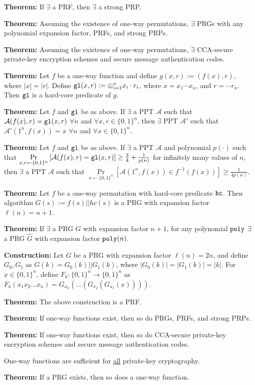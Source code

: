 \documentclass[10pt]{article}
\newcommand{\AAA}{\mathcal{A}}
\newcommand{\thm}[1]{{\bf Theorem:} \underline{#1}}
\newcommand{\con}[1]{{\bf Construction:} \underline{#1}}
\newcommand{\xor}{\oplus}
\newcommand{\poly}{{\tt poly}}
\newcommand{\hc}{{\tt hc}}
\newcommand{\gl}{{\tt gl}}
\newcommand{\from}{\leftarrow}
\begin{document}
\begin{multicols}{4}
\thm{}If $\exists$ a PRF, then $\exists$ a strong PRP.

\thm{}Assuming the existence of one-way permutations, $\exists$ PRGs with any polynomial expansion factor, PRFs, and strong PRPs.

\thm{}Assuming the existence of one-way permutations, $\exists$ CCA-secure private-key encryption schemes and secure message authentication codes.

\thm{}Let $f$ be a one-way function and define $g(x,r):=(f(x),r)$, where $|x|=|r|$. Define $\gl(x,r):=\xor_{i=1}^{n}x_i\cdot r_i$, where $x=x_1\cdots x_n$, and $r=\cdots r_n$. Then $\gl$ is a hard-core predicate of $g$.

\thm{}Let $f$ and $\gl$ be as above. If $\exists$ a PPT $\AAA$ such that $\AAA(f(x),r)=\gl(x,r)$ $\forall n$ and $\forall x,r\in\{0,1\}^n$, then $\exists$ PPT $\AAA'$ such that $\AAA'(1^n,f(x))=x$ $\forall n$ and $\forall x\in\{0,1\}^n$.

\thm{}Let $f$ and $\gl$ be as above. If $\exists$ a PPT $\AAA$ and polynomial $p(\cdot)$ such that $\Pr\limits_{x,r\from\{0,1\}^n}\left[\AAA(f(x),r)=\gl(x,r)\right]\geq\frac{3}{4}+\frac{1}{p(n)}$ for infinitely many values of $n$, then $\exists$ a PPT $\AAA$ such that $\Pr\limits_{x\from\{0,1\}^n}\left[\AAA(1^n,f(x))\in f^{-1}(f(x))\right]\geq\frac{1}{4p(n)}$.

\thm{}Let $f$ be a one-way permutation with hard-core predicate $\hc$. Then algorithm $G(s):=f(s)||hc(s)$ is a PRG with expansion factor $\ell(n)=n+1$.

\thm{}If $\exists$ a PRG $G$ with expansion factor $n+1$, for any polynomial $\poly$ $\exists$ a PRG $\hat{G}$ with expansion factor $\poly(n)$.

\con{}Let $G$ be a PRG with expansion factor $\ell(n)=2n$, and define $G_0,G_1$ as $G(k)=G_0(k)||G_1(k)$, where $|G_0(k)|=|G_1(k)|=|k|$. For $x\in\{0,1\}^n$, define $F_k:\{0,1\}^n\to\{0,1\}^n$ as $F_k(x_1x_2\dots x_n)=G_{x_n}(\dots(G_{x_2}(G_{x_1}(x))))$.

\thm{}The above construction is a PRF.

\thm{}If one-way functions exist, then so do PRGs, PRFs, and strong PRPs.

\thm{}If one-way functions exist, then so do CCA-secure private-key encryption schemes and secure message authentication codes.

One-way functions are sufficient for \underline{all} private-key cryptography.

\thm{}If a PRG exists, then so does a one-way function.


\end{multicols}
\end{document}
